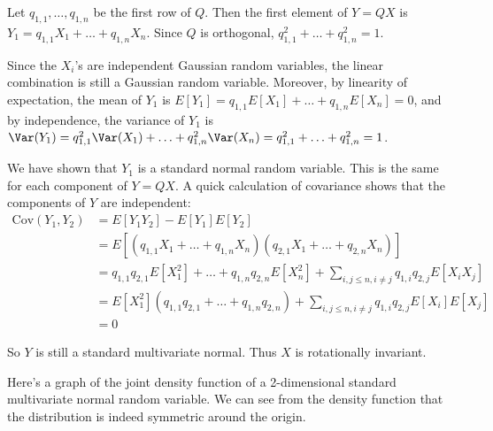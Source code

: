 \documentclass{article}
\begin{document}
Let $q_{1,1}, \ldots, q_{1,n}$ be the first row of $Q$. Then the first element of $Y = QX$ is $Y_1 = q_{1,1} X_1 + \ldots + q_{1,n} X_n$. Since $Q$ is orthogonal, $q_{1,1}^2 + \ldots + q_{1,n}^2 = 1$.

Since the $X_i$'s are independent Gaussian random variables, the linear combination is still a Gaussian random variable. Moreover, by linearity of expectation, the mean of $Y_1$ is $E[Y_1] = q_{1,1} E[X_1] + \ldots + q_{1,n} E[X_n] = 0$, and by independence, the variance of $Y_1$ is $\Var(Y_1) = q_{1,1}^2 \Var(X_1) + \ldots + q_{1,n}^2 \Var(X_n) = q_{1,1}^2 + \ldots + q_{1,n}^2 = 1$.

We have shown that $Y_1$ is a standard normal random variable. This is the same for each component of $Y = QX$. A quick calculation of covariance shows that the components of $Y$ are independent:
\begin{align*}
    \mathrm{Cov}(Y_1, Y_2)
     & = E[Y_1 Y_2] - E[Y_1] E[Y_2]                                                                                            \\
     & = E[(q_{1,1} X_1 + \ldots + q_{1,n} X_n)(q_{2,1} X_1 + \ldots + q_{2,n} X_n)]                                           \\
     & = q_{1,1} q_{2,1} E[X_1^2] + \ldots + q_{1,n} q_{2,n} E[X_n^2] + \sum_{i,j \leq n, i \neq j} q_{1,i} q_{2,j} E[X_i X_j] \\
     & = E[X_1^2] (q_{1,1} q_{2,1} + \ldots + q_{1,n} q_{2,n}) + \sum_{i,j \leq n, i \neq j} q_{1,i} q_{2,j} E[X_i] E[X_j]     \\
     & = 0
\end{align*}

So $Y$ is still a standard multivariate normal. Thus $X$ is rotationally invariant.

Here's a graph of the joint density function of a 2-dimensional standard multivariate normal random variable. We can see from the density function that the distribution is indeed symmetric around the origin.
\end{document}
